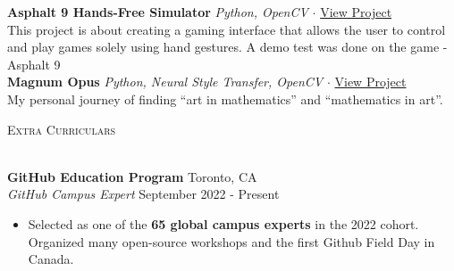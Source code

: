 \documentclass[a4paper]{article}
\newcommand{\lineunder} {
    \vspace*{-8pt} \\
    \hspace*{-18pt} \hrulefill \\
}
\newcommand{\header} [1] {
    {\hspace*{-18pt}\vspace*{6pt} \textsc{#1}}
    \vspace*{-6pt} \lineunder
}
\begin{document}
\vspace*{2mm}
{\textbf{Asphalt 9 Hands-Free Simulator}} {\sl Python, OpenCV} $\cdot$ \href{https://github.com/pandyah5/asphalt9_OpenCV_Simulation?tab=readme-ov-file}{View Project} \\
This project is about creating a gaming interface that allows the user to control and play games solely using hand gestures. A demo test was done on the game - Asphalt 9\\
\vspace*{2mm}
{\textbf{Magnum Opus}} {\sl Python, Neural Style Transfer, OpenCV} $\cdot$ \href{https://pandyah5.github.io/magnum_opus/pista.html}{View Project} \\
My personal journey of finding “art in mathematics” and “mathematics in art”.\\
\vspace*{2mm}

\header{Extra Curriculars}
\vspace{1mm}

\textbf{GitHub Education Program} \hfill Toronto, CA\\
\textit{GitHub Campus Expert} \hfill September 2022 - Present\\
\vspace{-3mm}
\begin{itemize} \itemsep 0.5pt
	\item Selected as one of the \textbf{65 global campus experts} in the 2022 cohort. Organized many open-source workshops and the first Github Field Day in Canada.
\end{itemize}
\end{document}
